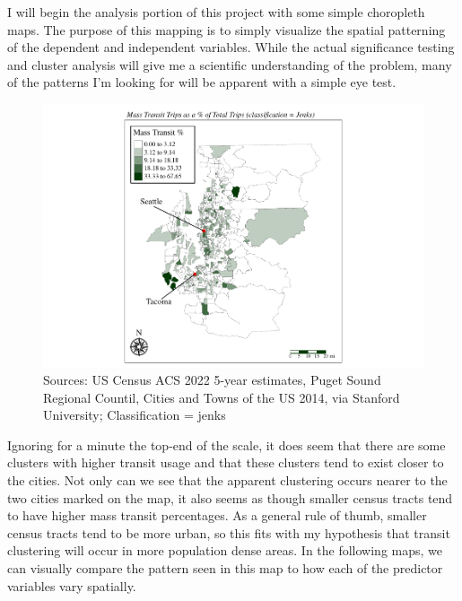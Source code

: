 \documentclass[
]{article}
\begin{document}
I will begin the analysis portion of this project with some simple
choropleth maps. The purpose of this mapping is to simply visualize the
spatial patterning of the dependent and independent variables. While the
actual significance testing and cluster analysis will give me a
scientific understanding of the problem, many of the patterns I'm
looking for will be apparent with a simple eye test.

\begin{figure}
\centering
\includegraphics{transit-hotspots-PSRC_files/figure-latex/unnamed-chunk-3-1.pdf}
\caption{Sources: US Census ACS 2022 5-year estimates, Puget Sound
Regional Countil, Cities and Towns of the US 2014, via Stanford
University; Classification = jenks}
\end{figure}

Ignoring for a minute the top-end of the scale, it does seem that there
are some clusters with higher transit usage and that these clusters tend
to exist closer to the cities. Not only can we see that the apparent
clustering occurs nearer to the two cities marked on the map, it also
seems as though smaller census tracts tend to have higher mass transit
percentages. As a general rule of thumb, smaller census tracts tend to
be more urban, so this fits with my hypothesis that transit clustering
will occur in more population dense areas. In the following maps, we can
visually compare the pattern seen in this map to how each of the
predictor variables vary spatially.

\newpage
\end{document}
